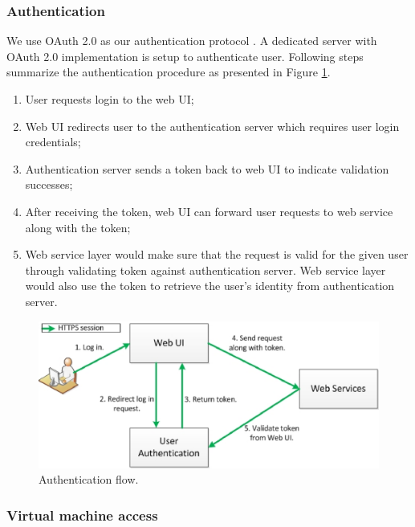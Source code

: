\documentclass{acm_proc_article-sp}
\begin{document}
\subsubsection{Authentication} \label{subsubtitle:auth}
We use OAuth 2.0 as our authentication protocol \cite{OAuth2}. A dedicated server with OAuth 2.0 implementation is setup to authenticate user. Following steps summarize the authentication procedure as presented in Figure \ref{fig:auth}.
\begin{enumerate}
  \item User requests login to the web UI;
  \item Web UI redirects user to the authentication server which requires user login credentials;
  \item Authentication server sends a token back to web UI to indicate validation successes;
  \item After receiving the token, web UI can forward user requests to web service along with the token;
  \item Web service layer would make sure that the request is valid for the given user through validating token against authentication server. Web service layer would also use the token to retrieve the user's identity from authentication server.
\end{enumerate}

\begin{figure}[ht]
  \centering
  \includegraphics[scale=0.5]{figures/workflow-authentication}
  \caption{Authentication flow.}
  \label{fig:auth}
\end{figure}

\subsubsection{Virtual machine access}
\end{document}
